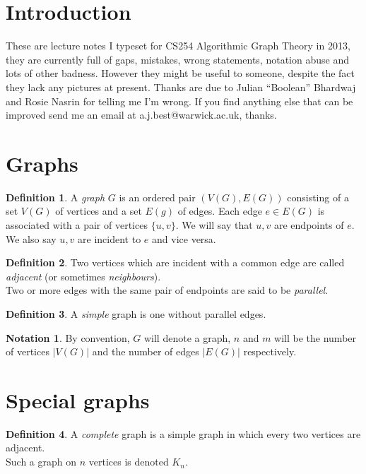 \documentclass{article}
\theoremstyle{definition}
\newtheorem*{defn}{Definition}
\newtheorem*{nota}{Notation}
\begin{document}
\maketitle
\tableofcontents
\section*{Introduction}
These are lecture notes I typeset for CS254 Algorithmic Graph Theory in 2013, they are currently full of gaps, mistakes, wrong statements, notation abuse and lots of other badness.
However they might be useful to someone, despite the fact they lack any pictures at present.
Thanks are due to Julian ``Boolean'' Bhardwaj and Rosie Nasrin for telling me I'm wrong.
If you find anything else that can be improved send me an email at a.j.best@warwick.ac.uk, thanks.
\clearpage

\section{Graphs}
\begin{defn}
A \emph{graph} $G$ is an ordered pair $(V(G),E(G))$ consisting of a set $V(G)$ of vertices and a set $E(g)$ of edges.
Each edge $e\in E(G)$ is associated with a pair of vertices $\{u,v\}$.
We will say that $u,v$ are endpoints of $e$.
We also say $u,v$ are incident to $e$ and vice versa.
\end{defn}

\begin{defn}
Two vertices which are incident with a common edge are called \emph{adjacent} (or sometimes \emph{neighbours}). \\
Two or more edges with the same pair of endpoints are said to be \emph{parallel}.
\end{defn}

\begin{defn}
A \emph{simple} graph is one without parallel edges.
\end{defn}

\begin{nota}
By convention, $G$ will denote a graph, $n$ and $m$ will be the number of vertices $|V(G)|$ and the number of edges $|E(G)|$ respectively.
\end{nota}

\section{Special graphs}
\begin{defn}
A \emph{complete} graph is a simple graph in which every two vertices are adjacent. \\
Such a graph on $n$ vertices is denoted $K_n$.
\end{defn}
\begin{center}
\end{center}
\end{document}
